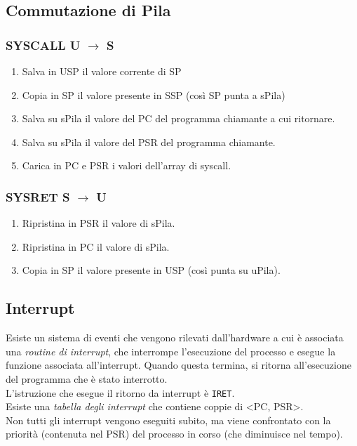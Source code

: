 \documentclass[10pt,a4paper]{article}
\newcommand{\code}{\texttt}
\begin{document}
\subsection{Commutazione di Pila}
\subsubsection{SYSCALL U $\rightarrow$ S}

\begin{enumerate}
    \item Salva in USP il valore corrente di SP
    \item Copia in SP il valore presente in SSP (così SP punta a sPila)
    \item Salva su sPila il valore del PC del programma chiamante a cui ritornare.
    \item Salva su sPila il valore del PSR del programma chiamante.
    \item Carica in PC e PSR i valori dell'array di syscall.
\end{enumerate}

\subsubsection{SYSRET S $\rightarrow$ U}\begin{enumerate}
    \item Ripristina in PSR il valore di sPila.
    \item Ripristina in PC il valore di sPila.
    \item Copia in SP il valore presente in USP (così punta su uPila).
\end{enumerate}

\subsection{Interrupt}
Esiste un sistema di eventi che vengono rilevati dall'hardware a cui è associata una \emph{routine di interrupt}, che interrompe l'esecuzione del processo e esegue la funzione associata all'interrupt. Quando questa termina, si ritorna all'esecuzione del programma che è stato interrotto.\\
L'istruzione che esegue il ritorno da interrupt è \code{IRET}.\\
Esiste una \emph{tabella degli interrupt} che contiene coppie di <PC, PSR>.\\
Non tutti gli interrupt vengono eseguiti subito, ma viene confrontato con la priorità (contenuta nel PSR) del processo in corso (che diminuisce nel tempo).
\end{document}
